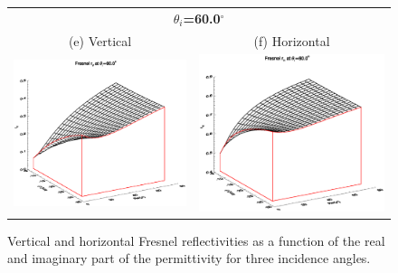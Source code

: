 \begin{figure}[htp]
\begin{tabular}{c c}
    \multicolumn{2}{c}{\boldmath$\theta_i$\unboldmath\sffamily\textbf{=60.0}\boldmath$^\circ$\unboldmath}\\
    \textsf{(e) Vertical} &
    \textsf{(f) Horizontal} \\
    \includegraphics[bb=135 240 508 540,clip,scale=0.5]{graphics/Fresnel/rv_z60.0.eps} &
    \includegraphics[bb=135 240 508 540,clip,scale=0.5]{graphics/Fresnel/rh_z60.0.eps}
  \end{tabular}
  \caption{Vertical and horizontal Fresnel reflectivities as a function of the real and imaginary part of the permittivity for three incidence angles.}
  \label{fig:fresnel_reflectivity}
\end{figure}


